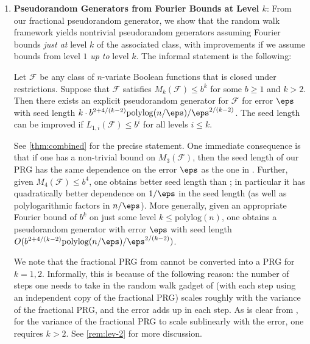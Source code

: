 \begin{enumerate}
\item \textbf{Pseudorandom Generators from Fourier Bounds at Level $k$}: From our fractional pseudorandom generator, we show that the random walk framework yields nontrivial pseudorandom generators assuming Fourier bounds \emph{just at} level $k$ of the associated class, with improvements if we assume bounds from level $1$ \emph{up to} level $k$. The informal statement is the following:

\begin{THM}
\label{thm:levelkprg}
Let $\mathcal{F}$ be any class of $n$-variate Boolean functions that is closed under restrictions. Suppose that $\mathcal{F}$ satisfies $M_{k}(\mathcal{F})\leq b^{k}$ for some  $b\geq 1$ and  $k>2$. Then there exists an explicit pseudorandom generator for $\mathcal{F}$  for error $\eps$ with seed length $k\cdot b^{2+4/(k-2)}\mathrm{polylog}(n/\eps)/\eps^{2/(k-2)}$. The seed length can be improved if $L_{1,i}(\mathcal{F}) \le b^i$ for all levels $i \le k$.
\end{THM}

 See \cref{thm:combined} for the precise statement. One immediate consequence is that if one has a non-trivial bound on $M_3(\mathcal{F})$, then the seed length of our PRG has the same dependence on the error $\eps$ as the one in \cite{CHLT}.  Further, given $M_4(\mathcal{F}) \le b^4$, one obtains better seed length than \cite{CHLT}; in particular it has quadratically better dependence on $1/\eps$ in the seed length (as well as polylogarithmic factors in $n/\eps$).  More generally, given an appropriate Fourier bound of $b^k$ on just some level $k\leq \mathrm{polylog}(n)$, one obtains a pseudorandom generator with error $\eps$ with seed length $O(b^{2+4/(k-2)}\mathrm{polylog}(n/\eps)/\eps^{2/(k-2)})$. 
 
We note that the fractional PRG from  cannot be converted into a PRG for $k=1,2$. Informally, this is because of the following reason: the number of steps one needs to take in the random walk gadget of \cite{CHHL} (with each step using an independent copy of the fractional PRG) scales roughly with the variance of the fractional PRG, and the error adds up in each step.  As is clear from , for the variance of the fractional PRG to scale sublinearly with the error, one requires $k>2$. See \cref{rem:lev-2} for more discussion. 



\end{enumerate}
